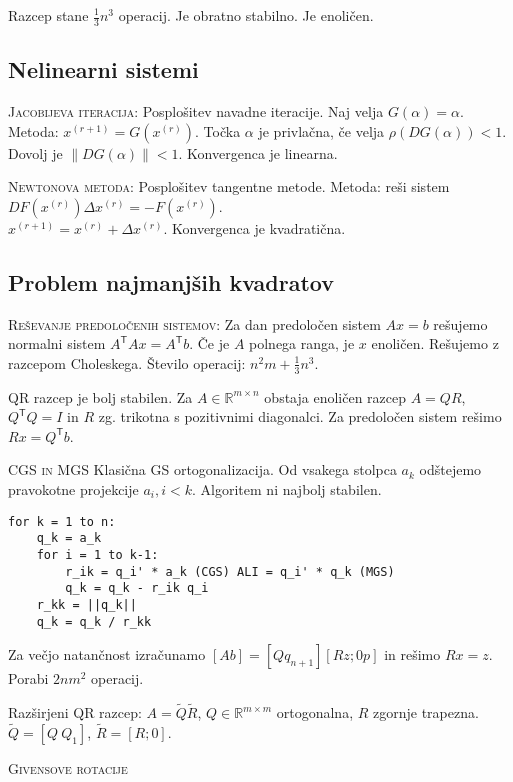 \documentclass[a4paper,10pt]{article}
\theoremstyle{definition}
\def\R{\mathbb{R}}
\newcommand{\T}{\mathsf{T}\!}
\begin{document}
Razcep stane $\frac13n^3$ operacij. Je obratno stabilno. Je enoličen.

\subsection*{Nelinearni sistemi}

\textsc{Jacobijeva iteracija:}
Posplošitev navadne iteracije. Naj velja $G(\alpha)= \alpha$. Metoda: $x^{(r+1)}
= G(x^{(r)})$. Točka $\alpha$ je privlačna, če velja $\rho(DG(\alpha)) < 1$.
Dovolj je $\|DG(\alpha)\| < 1$.  Konvergenca je linearna.

\textsc{Newtonova metoda:}
Posplošitev tangentne metode. Metoda: reši sistem $DF(x^{(r)})\Delta x^{(r)} =
-F(x^{(r)})$. \\ $x^{(r+1)} = x^{(r)} + \Delta x^{(r)}$. Konvergenca je
kvadratična.

\subsection*{Problem najmanjših kvadratov}

\textsc{Reševanje predoločenih sistemov:} Za dan predoločen sistem $Ax=b$
rešujemo normalni sistem $A^\T Ax=A^\T b$. Če je $A$ polnega ranga, je $x$ enoličen.
Rešujemo z razcepom Choleskega. Število operacij: $n^2m + \frac13n^3$.

QR razcep je bolj stabilen. Za $A \in \R^{m\times n}$ obstaja enoličen razcep $A
= QR$, $Q^\T Q = I$ in $R$ zg. trikotna s pozitivnimi diagonalci. Za predoločen
sistem rešimo $Rx = Q^\T b$.

\textsc{CGS in MGS} Klasična GS ortogonalizacija. Od vsakega stolpca $a_k$
odštejemo pravokotne projekcije $a_i, i < k$. Algoritem ni najbolj stabilen.
\scriptsize
\begin{verbatim}
for k = 1 to n:
    q_k = a_k
    for i = 1 to k-1:
        r_ik = q_i' * a_k (CGS) ALI = q_i' * q_k (MGS)
        q_k = q_k - r_ik q_i
    r_kk = ||q_k||
    q_k = q_k / r_kk
\end{verbatim}
\normalsize
Za večjo natančnost izračunamo $[A b] = [Q q_{n+1}] [R z; 0 p]$ in rešimo $Rx =
z$. Porabi $2nm^2$ operacij.

Razširjeni QR razcep: $A = \tilde{Q}\tilde{R}$, $Q \in \R^{m \times m}$
ortogonalna, $R$ zgornje trapezna. $\tilde{Q} = [Q\ Q_1]$, $\tilde{R} = [R; 0]$.

\textsc{Givensove rotacije}
\end{document}
